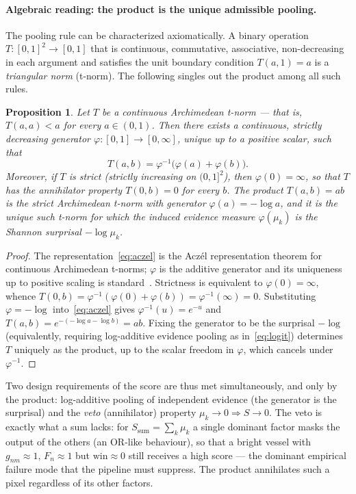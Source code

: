 \documentclass[11pt,a4paper]{article}
\newtheorem{proposition}{Proposition}
\begin{document}
\paragraph{Algebraic reading: the product is the unique admissible pooling.} The
pooling rule can be characterized axiomatically. A binary operation
$T:[0,1]^2\to[0,1]$ that is continuous, commutative, associative, non-decreasing
in each argument and satisfies the unit boundary condition $T(a,1)=a$ is a
\emph{triangular norm} (t-norm). The following singles out the product among all
such rules.

\begin{proposition}\label{prop:tnorm}
Let $T$ be a continuous Archimedean t-norm --- that is, $T(a,a)<a$ for every
$a\in(0,1)$. Then there exists a continuous, strictly decreasing generator
$\varphi:[0,1]\to[0,\infty]$, unique up to a positive scalar, such that
\begin{equation}
T(a,b)=\varphi^{-1}\!\big(\varphi(a)+\varphi(b)\big).
\label{eq:aczel}
\end{equation}
Moreover, if $T$ is \emph{strict} (strictly increasing on $(0,1]^2$), then
$\varphi(0)=\infty$, so that $T$ has the annihilator property $T(0,b)=0$ for every
$b$. The product $T(a,b)=ab$ is the strict Archimedean t-norm with generator
$\varphi(a)=-\log a$, and it is the unique such t-norm for which the induced
evidence measure $\varphi(\mu_k)$ is the Shannon surprisal $-\log\mu_k$.
\end{proposition}

\begin{proof}
The representation~\eqref{eq:aczel} is the Aczél representation theorem for
continuous Archimedean t-norms; $\varphi$ is the additive generator and its
uniqueness up to positive scaling is standard~\cite{bao2000}. Strictness is
equivalent to $\varphi(0)=\infty$, whence
$T(0,b)=\varphi^{-1}(\varphi(0)+\varphi(b))=\varphi^{-1}(\infty)=0$. Substituting
$\varphi=-\log$ into~\eqref{eq:aczel} gives $\varphi^{-1}(u)=e^{-u}$ and
$T(a,b)=e^{-(-\log a-\log b)}=ab$. Fixing the generator to be the surprisal
$-\log$ (equivalently, requiring log-additive evidence pooling as
in~\eqref{eq:logit}) determines $T$ uniquely as the product, up to the scalar
freedom in $\varphi$, which cancels under $\varphi^{-1}$.
\end{proof}

Two design requirements of the score are thus met simultaneously, and only by the
product: log-additive pooling of independent evidence (the generator is the
surprisal) and the \emph{veto} (annihilator) property
$\mu_k\to0\Rightarrow S\to0$. The veto is exactly what a sum lacks: for
$S_{\mathrm{sum}}=\sum_k\mu_k$ a single dominant factor masks the output of the
others (an OR-like behaviour), so that a bright vessel with
$g_{nm}\approx1,\,F_n\approx1$ but $\mathrm{win}\approx0$ still receives a high
score --- the dominant empirical failure mode that the pipeline must suppress. The
product annihilates such a pixel regardless of its other factors.
\end{document}
